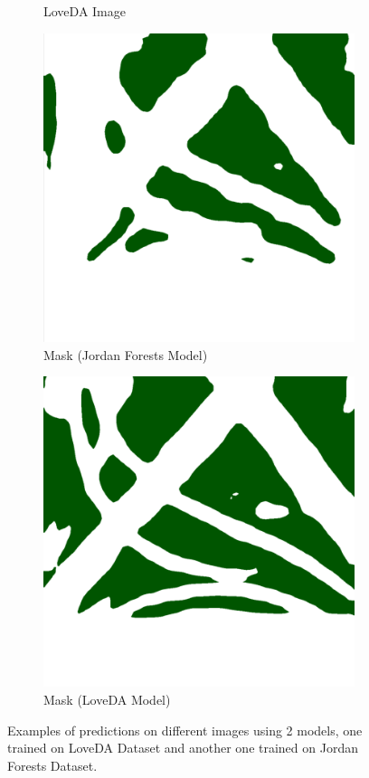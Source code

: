 \begin{figure}[H]
\begin{subfigure}{0.32\textwidth}
    \caption{LoveDA Image}
    \label{fig:img1}
\end{subfigure}
\hfill
\begin{subfigure}{0.32\textwidth}
    \centering
    \includegraphics[width=\textwidth]{IMAGENES/Result_Mask3_J.png}
    \caption{Mask (Jordan Forests Model)}
    \label{fig:img2}
\end{subfigure}
\hfill
\begin{subfigure}{0.32\textwidth}
    \centering
    \includegraphics[width=\textwidth]{IMAGENES/Result_Mask3_Lo.png}
    \caption{Mask (LoveDA Model)}
    \label{fig:img3}
\end{subfigure}
\caption{Examples of predictions on different images using 2 models, one trained on LoveDA Dataset and another one trained on Jordan Forests Dataset.}
\label{fig:combined}
\end{figure}


